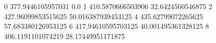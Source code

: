 0 377.9446105957031 0.0
1 410.5870666503906 32.6424560546875
2 427.96099853515625 50.016387939453125
4 435.62799072265625 57.683380126953125
6 417.94610595703125 40.001495361328125
8 406.1191101074219 28.17449951171875
